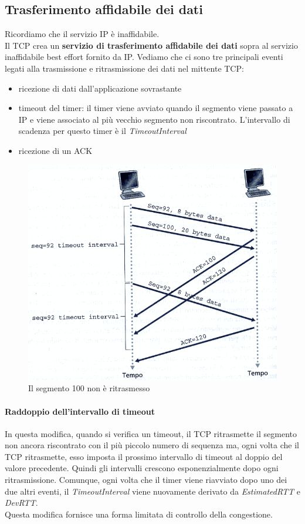 \documentclass[11pt,a4paper]{book}
\begin{document}
\subsection{Trasferimento affidabile dei dati}
Ricordiamo che il servizio IP è inaffidabile.\\
Il TCP crea un \textbf{servizio di trasferimento affidabile dei dati} sopra al servizio inaffidabile best effort fornito da IP. Vediamo che ci sono tre principali eventi legati alla trasmissione e ritrasmissione dei dati nel mittente TCP:
\begin{itemize}
	\item ricezione di dati dall'applicazione sovrastante
	\item timeout del timer: il timer viene avviato quando il segmento viene passato a IP e viene associato al più vecchio segmento non riscontrato. L'intervallo di scadenza per questo timer è il \emph{TimeoutInterval}
	\item ricezione di un ACK
\end{itemize}
\begin{figure}
	\includegraphics[scale=0.6]{img/033.png}
	\caption{Il segmento 100 non è ritrasmesso}
\end{figure}
\paragraph{Raddoppio dell'intervallo di timeout}
In questa modifica, quando si verifica un timeout, il TCP ritrasmette il segmento non ancora riscontrato con il più piccolo numero di sequenza ma, ogni volta che il TCP ritrasmette, esso imposta il prossimo intervallo di timeout al doppio del valore precedente. Quindi gli intervalli crescono esponenzialmente dopo ogni ritrasmissione. Comunque, ogni volta che il timer viene riavviato dopo uno dei due altri eventi, il \emph{TimeoutInterval} viene nuovamente derivato da \emph{EstimatedRTT} e \emph{DevRTT}. \\
Questa modifica fornisce una forma limitata di controllo della congestione.
\end{document}
